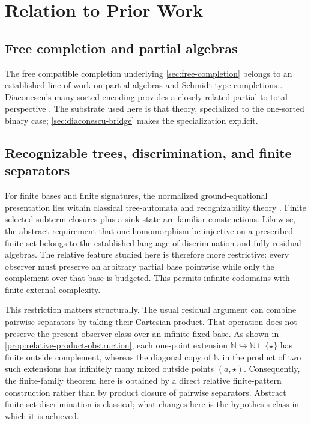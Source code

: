 \section{Relation to Prior Work}\label{sec:related-work}

\subsection{Free completion and partial algebras}
The free compatible completion underlying \cref{sec:free-completion} belongs to
an established line of work on partial algebras and Schmidt-type completions
\cite{ClimentVidalCosmeLlopez2023}.  Diaconescu's many-sorted encoding provides
a closely related partial-to-total perspective \cite{Diaconescu2009}.  The substrate used here is that theory, specialized to the one-sorted binary
case; \cref{sec:diaconescu-bridge} makes the specialization explicit.

\subsection{Recognizable trees, discrimination, and finite separators}
For finite bases and finite signatures, the normalized ground-equational
presentation lies within classical tree-automata and recognizability theory
\cite{Kozen1977,Brainerd1969,DauchetTison1990,ComonEtAl2008}.  Finite selected
subterm closures plus a sink state are familiar constructions.  Likewise, the
abstract requirement that one homomorphism be injective on a prescribed finite
set belongs to the established language of discrimination and fully residual
algebras.  The relative feature studied here is therefore more restrictive:
every observer must preserve an arbitrary partial base pointwise while only the
complement over that base is budgeted.  This permits infinite codomains with
finite external complexity.

This restriction matters structurally.  The usual residual argument can combine
pairwise separators by taking their Cartesian product.  That operation does not
preserve the present observer class over an infinite fixed base.  As shown in
\cref{prop:relative-product-obstruction}, each one-point extension
$\mathbb N\hookrightarrow\mathbb N\sqcup\{\star\}$ has finite outside
complement, whereas the diagonal copy of $\mathbb N$ in the product of two such
extensions has infinitely many mixed outside points $(a,\star)$.  Consequently,
the finite-family theorem here is obtained by a direct relative finite-pattern
construction rather than by product closure of pairwise separators.  Abstract finite-set discrimination is classical; what changes here is the
hypothesis class in which it is achieved.

